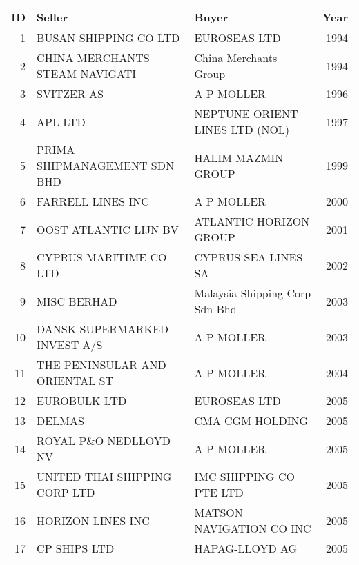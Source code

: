 
\begin{tabular}[t]{rllr}
\toprule
ID & Seller & Buyer & Year\\
\midrule
1 & BUSAN SHIPPING CO LTD & EUROSEAS LTD & 1994\\
2 & CHINA MERCHANTS STEAM NAVIGATI & China Merchants Group & 1994\\
3 & SVITZER AS & A P MOLLER & 1996\\
4 & APL LTD & NEPTUNE ORIENT LINES LTD (NOL) & 1997\\
5 & PRIMA SHIPMANAGEMENT SDN BHD & HALIM MAZMIN GROUP & 1999\\
6 & FARRELL LINES INC & A P MOLLER & 2000\\
7 & OOST ATLANTIC LIJN BV & ATLANTIC HORIZON GROUP & 2001\\
8 & CYPRUS MARITIME CO LTD & CYPRUS SEA LINES SA & 2002\\
9 & MISC BERHAD & Malaysia Shipping Corp Sdn Bhd & 2003\\
10 & DANSK SUPERMARKED INVEST A/S & A P MOLLER & 2003\\
11 & THE PENINSULAR AND ORIENTAL ST & A P MOLLER & 2004\\
12 & EUROBULK LTD & EUROSEAS LTD & 2005\\
13 & DELMAS & CMA CGM HOLDING & 2005\\
14 & ROYAL P\&O NEDLLOYD NV & A P MOLLER & 2005\\
15 & UNITED THAI SHIPPING CORP LTD & IMC SHIPPING CO PTE LTD & 2005\\
16 & HORIZON LINES INC & MATSON NAVIGATION CO INC & 2005\\
17 & CP SHIPS LTD & HAPAG-LLOYD AG & 2005\\
\bottomrule
\end{tabular}

